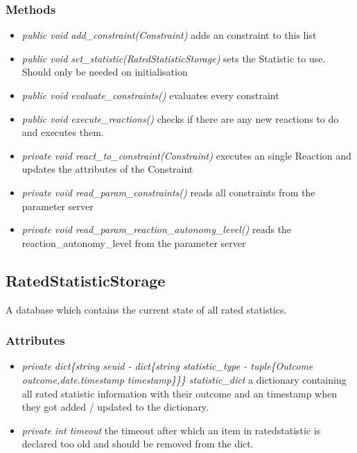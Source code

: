 \subsubsection{Methods}
\begin{itemize}
	\item \textit{ public void add\_constraint(Constraint)  }
		adds an constraint to this list
	\item \textit{ public void set\_statistic(RatedStatisticStorage)  }
		sets the Statistic to use. Should only be needed on initialisation
	\item \textit{ public void evaluate\_constraints()  }
		evaluates every constraint
	\item \textit{ public void execute\_reactions()  }
		checks if there are any new reactions to do and executes them.
	\item \textit{ private void react\_to\_constraint(Constraint)  }
		executes an single Reaction and updates the attributes of the Constraint
	\item \textit{ private void read\_param\_constraints()  }
		reads all constraints from the parameter server
	\item \textit{ private void read\_param\_reaction\_autonomy\_level()  }
		reads the reaction\_autonomy\_level from the parameter server
\end{itemize}


\subsection{RatedStatisticStorage}
A database which contains the current state of all rated statistics.
\subsubsection{Attributes}
\begin{itemize}
	\item \textit{ private dict\{string seuid - dict\{string statistic\_type - tuple\{Outcome outcome,date.timestamp timestamp\}\}\} statistic\_dict }
		a dictionary containing all rated statistic information with their outcome and an timestamp when they got added / updated to the dictionary.
	\item \textit{ private int timeout }
		the timeout after which an item in ratedstatistic is declared too old and should be removed from the dict.
\end{itemize}
